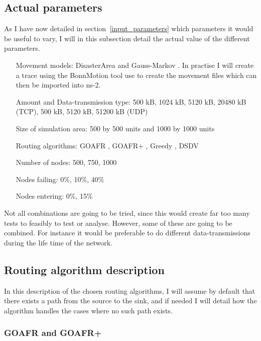 \subsection{Actual parameters}
As I have now detailed in section~\ref{input_parameters} which parameters it would be useful to vary, I will in this subsection detail the actual value of the different parameters. 

\begin{itemize}
\item[Movement models:] DisasterArea \cite{disasterArea} and Gauss-Markov \cite{MobilityAdHocResearch}. In practise I will create a trace using the BonnMotion tool \cite{toilers} use to create the movement files which can then be imported into ns-2.
\item[Amount and Data-transmission type:] 500 kB, 1024 kB, 5120 kB, 20480 kB (TCP), 500 kB, 5120 kB, 51200 kB (UDP)
\item[Size of simulation area:] 500 by 500 units and 1000 by 1000 units
\item[Routing algorithms:] GOAFR \cite{gopher}, GOAFR+ \cite{gopher+}, Greedy \cite{gopher}, DSDV \cite{DSDV}
\item[Number of nodes:] 500, 750, 1000
\item[Nodes failing:] 0\%, 10\%, 40\%
\item[Nodes entering:] 0\%, 15\%
\end{itemize}

Not all combinations are going to be tried, since this would create far too many tests to feasibly to test or analyse. However, some of these are going to be combined. For instance it would be preferable to do different data-transmissions during the life time of the network.

\subsection{Routing algorithm description}
In this description of the chosen routing algorithms, I will assume by default that there exists a path from the source to the sink, and if needed I will detail how the algorithm handles the cases where no such path exists.

\subsubsection{GOAFR and GOAFR+}


